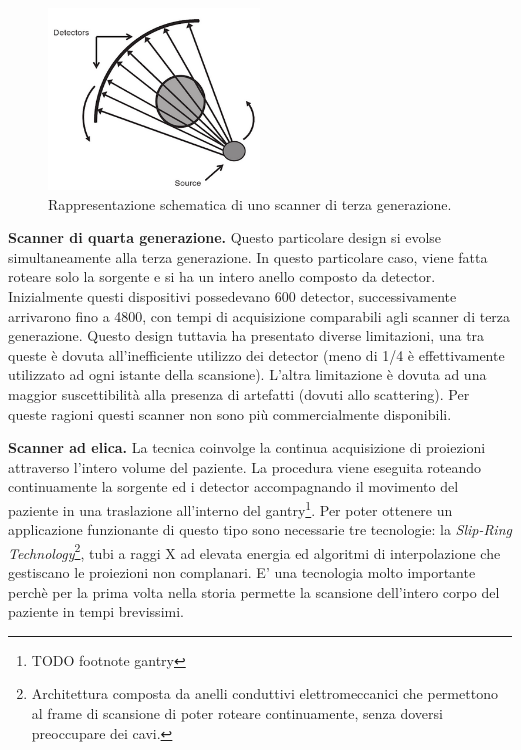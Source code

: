 \documentclass[a4paper,12pt, doubleside]{report}
\begin{document}
                    \begin{figure}[h]
                        \centering
                        \includegraphics[width=0.5\textwidth]{third-generation}
                        \caption{Rappresentazione schematica di uno scanner di terza generazione.}
                        \label{fig:third-generation}
                    \end{figure}
    
                \bigskip
                \par
                    \textbf{Scanner di quarta generazione.} Questo particolare design si evolse simultaneamente alla terza generazione. In questo particolare caso, viene fatta roteare solo la sorgente e si ha un intero anello composto da detector. Inizialmente questi dispositivi possedevano 600 detector, successivamente arrivarono fino a 4800, con tempi di acquisizione comparabili agli scanner di terza generazione. Questo design tuttavia ha presentato diverse limitazioni, una tra queste è dovuta all’inefficiente utilizzo dei detector (meno di 1/4 è effettivamente utilizzato ad ogni istante della scansione). L'altra limitazione è dovuta ad una maggior suscettibilità alla presenza di artefatti (dovuti allo scattering). Per queste ragioni questi scanner non sono più commercialmente disponibili.
                            
                    \textbf{Scanner ad elica.} La tecnica coinvolge la continua acquisizione di proiezioni attraverso l’intero volume del paziente. La procedura viene eseguita roteando continuamente la sorgente ed i detector accompagnando il movimento del paziente in una traslazione all’interno del gantry\footnote{TODO footnote gantry}. Per poter ottenere un applicazione funzionante di questo tipo sono necessarie tre tecnologie: la \textit{Slip-Ring Technology}\footnote{Architettura composta da anelli conduttivi elettromeccanici che permettono al frame di scansione di poter roteare continuamente, senza doversi preoccupare dei cavi.}, tubi a raggi X ad elevata energia ed algoritmi di interpolazione che gestiscano le proiezioni non complanari. E’ una tecnologia molto importante perchè per la prima volta nella storia permette la scansione dell’intero corpo del paziente in tempi brevissimi.
    
\end{document}
